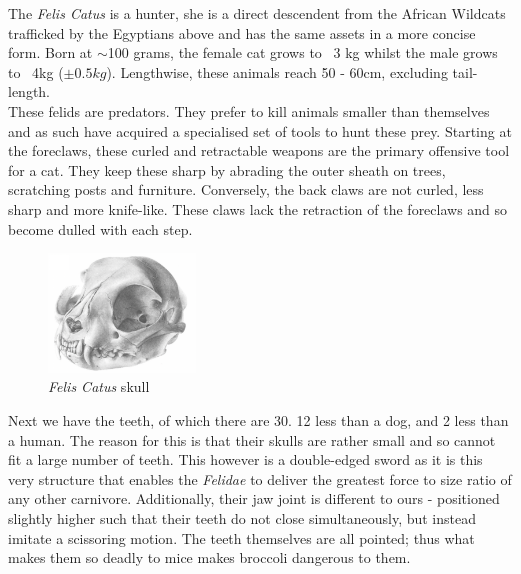 \documentclass{article}
\begin{document}
\noindent{}The \emph{Felis Catus} is a hunter, she is a direct descendent from the African Wildcats trafficked by the Egyptians above and has the same assets in a more concise form. Born at $\sim$100 grams, the female cat grows to ~3 kg whilst the male grows to ~4kg (\(\pm0.5kg\)). Lengthwise, these animals reach 50 - 60cm, excluding tail-length.\\

These \gls{felid}s are predators. They prefer to kill animals smaller than themselves and as such have acquired a specialised set of tools to hunt these prey. Starting at the foreclaws, these curled and retractable weapons are the primary offensive tool for a cat. They keep these sharp by abrading the outer sheath on trees, scratching posts and furniture. Conversely, the back claws are not curled, less sharp and more knife-like. These claws lack the retraction of the foreclaws and so become dulled with each step.\\

\begin{figure}
    \includegraphics[width=0.35\textwidth]{img/cat-skull.png}
    \caption{\emph{Felis Catus} skull}
\end{figure}


Next we have the teeth, of which there are 30. 12 less than a dog, and 2 less than a human. The reason for this is that their skulls are rather small and so cannot fit a large number of teeth. This however is a double-edged sword as it is this very structure that enables the \emph{Felidae} to deliver the greatest force to size ratio of any other carnivore. Additionally, their jaw joint is different to ours - positioned slightly higher such that their teeth do not close simultaneously, but instead imitate a scissoring motion. The teeth themselves are all pointed; thus what makes them so deadly to mice makes broccoli dangerous to them.\\
\end{document}

